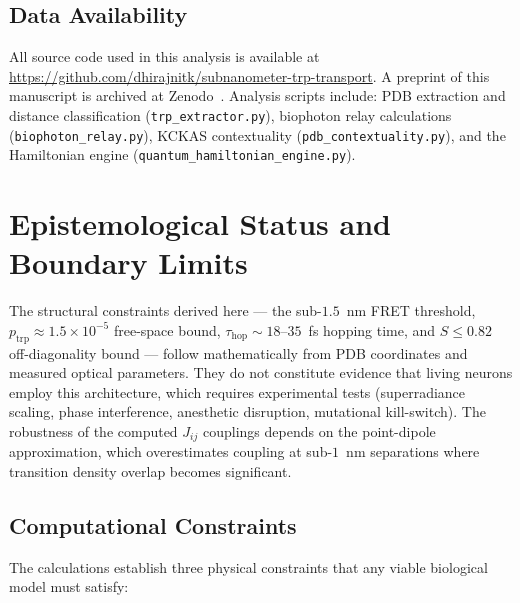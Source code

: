 \documentclass[aps,pre,twocolumn,showpacs,superscriptaddress]{revtex4-2}
\begin{document}
\subsection{Data Availability}

All source code used in this analysis is available at \url{https://github.com/dhirajnitk/subnanometer-trp-transport}. A preprint of this manuscript is archived at Zenodo~\cite{Zenodo2026}. Analysis scripts include: PDB extraction and distance classification (\texttt{trp\_extractor.py}), biophoton relay calculations (\texttt{biophoton\_relay.py}), KCKAS contextuality (\texttt{pdb\_contextuality.py}), and the Hamiltonian engine (\texttt{quantum\_hamiltonian\_engine.py}).

\section{Epistemological Status and Boundary Limits}

The structural constraints derived here --- the sub-$1.5$~nm FRET threshold, $p_{\mathrm{trp}} \approx 1.5\times10^{-5}$ free-space bound, $\tau_{\mathrm{hop}} \sim 18$--$35$~fs hopping time, and $S \leq 0.82$ off-diagonality bound --- follow mathematically from PDB coordinates and measured optical parameters. They do not constitute evidence that living neurons employ this architecture, which requires experimental tests (superradiance scaling, phase interference, anesthetic disruption, mutational kill-switch). The robustness of the computed $J_{ij}$ couplings depends on the point-dipole approximation, which overestimates coupling at sub-$1$~nm separations where transition density overlap becomes significant.

\subsection{Computational Constraints}

The calculations establish three physical constraints that any viable biological model must satisfy:
\end{document}
